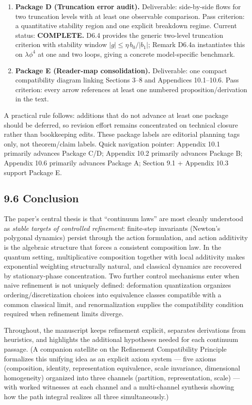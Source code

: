 \documentclass[
]{article}
\begin{document}
\begin{enumerate}
\item
  \textbf{Package D (Truncation error audit).} Deliverable: side-by-side
  flows for two truncation levels with at least one observable
  comparison. Pass criterion: a quantitative stability region and one
  explicit breakdown regime. Current status: \textbf{COMPLETE.} D6.4
  provides the generic two-level truncation criterion with stability
  window \(|g|\le\eta\,b_0/|b_1|\); Remark D6.4a instantiates this on
  \(\lambda\phi^4\) at one and two loops, giving a concrete
  model-specific benchmark.
\item
  \textbf{Package E (Reader-map consolidation).} Deliverable: one
  compact compatibility diagram linking Sections 3--8 and Appendices
  10.1--10.6. Pass criterion: every arrow references at least one
  numbered proposition/derivation in the text.
\end{enumerate}

A practical rule follows: additions that do not advance at least one
package should be deferred, so revision effort remains concentrated on
technical closure rather than bookkeeping edits. These package labels
are editorial planning tags only, not theorem/claim labels. Quick
navigation pointer: Appendix 10.1 primarily advances Package C/D;
Appendix 10.2 primarily advances Package B; Appendix 10.6 primarily
advances Package A; Section 9.1 + Appendix 10.3 support Package E.

\subsection{9.6 Conclusion}\label{conclusion}

The paper's central thesis is that ``continuum laws'' are most cleanly
understood as \emph{stable targets of controlled refinement}:
finite-step invariants (Newton's polygonal dynamics) persist through the
action formulation, and action additivity is the algebraic structure
that forces a consistent composition law. In the quantum setting,
multiplicative composition together with local additivity makes
exponential weighting structurally natural, and classical dynamics are
recovered by stationary-phase concentration. Two further control
mechanisms enter when naive refinement is not uniquely defined:
deformation quantization organizes ordering/discretization choices into
equivalence classes compatible with a common classical limit, and
renormalization supplies the compatibility condition required when
refinement limits diverge.

Throughout, the manuscript keeps refinement explicit, separates
derivations from heuristics, and highlights the additional hypotheses
needed for each continuum passage. (A companion satellite on the
Refinement Compatibility Principle formalizes this unifying idea as an
explicit axiom system --- five axioms (composition, identity,
representation equivalence, scale invariance, dimensional homogeneity)
organized into three channels (partition, representation, scale) ---
with worked witnesses at each channel and a multi-channel synthesis
showing how the path integral realizes all three simultaneously.)
\end{document}
